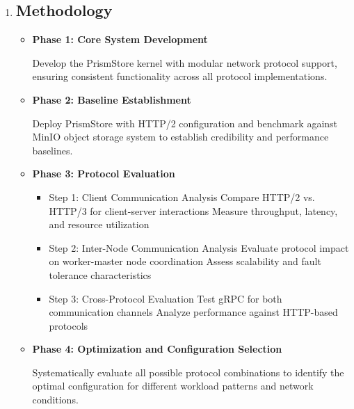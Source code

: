 \documentclass[12pt]{article}
\begin{document}
\begin{enumerate}
\begin{itemize}
            \item \textbf{Performance Evaluation Framework}

                The evaluation will systematically test protocol combinations across both communication channels, creating a comprehensive performance matrix.
        \end{itemize}

    \item \subsection*{Methodology}
    \begin{itemize}
        \item \textbf{ Phase 1: Core System Development}

        Develop the PrismStore kernel with modular network protocol support, ensuring consistent functionality across all protocol implementations.
        \item \textbf{ Phase 2: Baseline Establishment}

        Deploy PrismStore with HTTP/2 configuration and benchmark against MinIO object storage system to establish credibility and performance baselines.
        \item \textbf{ Phase 3: Protocol Evaluation}
            \begin{itemize}
                \item Step 1: Client Communication Analysis
                    Compare HTTP/2 vs. HTTP/3 for client-server interactions
                    Measure throughput, latency, and resource utilization

                \item Step 2: Inter-Node Communication Analysis
                    Evaluate protocol impact on worker-master node coordination
                    Assess scalability and fault tolerance characteristics

                \item Step 3: Cross-Protocol Evaluation
                    Test gRPC for both communication channels
                    Analyze performance against HTTP-based protocols
            \end{itemize}

        \item \textbf{ Phase 4: Optimization and Configuration Selection}

            Systematically evaluate all possible protocol combinations to identify the optimal configuration for different workload patterns and network conditions.
    \end{itemize}


\end{enumerate}
\end{document}
